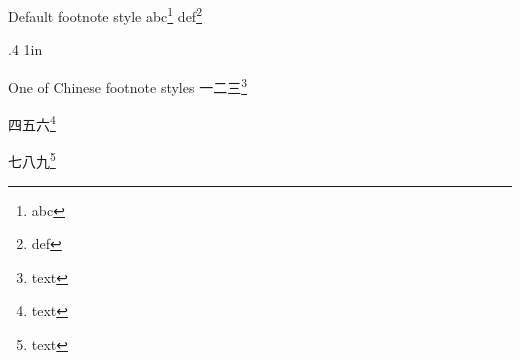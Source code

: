 \documentclass{ctexart}
\begin{document}
\makeatletter
\def\thempfootnote{{\@arabic\c@mpfootnote}}
\makeatother
\begin{example}{Default footnote style}
  abc\footnote{abc} def\footnote{def}
\end{example}

\makeatletter
\renewcommand\thefootnote{\textcircled{\@arabic\c@footnote}}

\xpatchcmd\@makefntext
  {{\hss\@makefnmark}}
  {{\hss\@makefnmarkNormal}\space}
  {}{\fail}

\def\@makefnmarkNormal{\lower .3ex \hbox{\normalfont\@thefnmark}}

\xpatchcmd\footnoterule
  {.4\columnwidth}
  {1in}
  {}{\fail}
\makeatother

\makeatletter
\def\thempfootnote{\textcircled{\@arabic\c@mpfootnote}}
\let\c@footnote\c@mpfootnote
\makeatother
\begin{example}{One of Chinese footnote styles}
  一二三\footnote{text}
  
  \addtocounter{footnote}{20}
  四五六\footnote{text}
  
  \addtocounter{footnote}{20}
  七八九\footnote{text}
\end{example}
\end{document}

